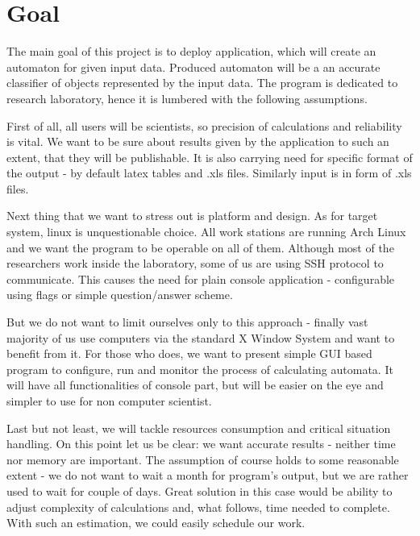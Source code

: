 \documentclass{article}
\begin{document}

\newpage
\section{Goal}
The main goal of this project is to deploy application, which will create an automaton for given input data. Produced automaton will be a an accurate classifier of objects represented
by the input data. The program is dedicated to research laboratory, hence it is lumbered with the following assumptions.


First of all, all users will be scientists, so precision of calculations and reliability is vital. We want to be sure about results given by the application to such an extent, that they will be publishable. It is also carrying need for specific format of the output - by default latex tables and .xls files. Similarly input is in form of .xls files.


Next thing that we want to stress out is platform and design. As for target system, linux is unquestionable choice. All work stations are running Arch Linux and we want the program to be operable on all of them. Although most of the researchers work inside the laboratory, some of us are using SSH protocol to communicate. This causes the need for plain console application - configurable using flags or simple question/answer scheme. 

But we do not want to limit ourselves only to this approach - finally vast majority of us use computers via the standard X Window System and want to benefit from it. For those who does, we want to present simple GUI based program to configure, run and monitor the process of calculating automata. It will have all functionalities of console part, but will be easier on the eye and simpler to use for non computer scientist.


Last but not least, we will tackle resources consumption and critical situation handling. On this point let us be clear: we want accurate results - neither time nor memory are important. The assumption of course holds to some reasonable extent - we do not want to wait a month for program's output, but we are rather used to wait for couple of days. Great solution in this case would be ability to adjust complexity of calculations and, what follows, time needed to complete. With such an estimation, we could easily schedule our work.

\end{document}
